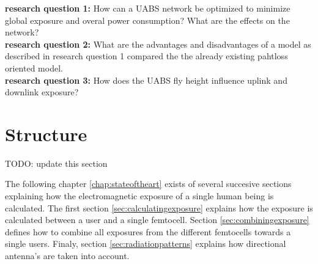 \textbf{research question 1:} How can a \gls{UABS} network be optimized to minimize global exposure and overal power consumption? What are the effects on the network?\\

\textbf{research question 2:} What are the advantages and disadvantages of a model as described in research question 1 compared the the already existing pahtloss oriented model.\\

\textbf{research question 3:} How does the \gls{UABS} fly height influence uplink and downlink exposure?



\section{Structure}
\label{sec:structure}

TODO: update this section

The following chapter \ref{chap:stateoftheart} exists of several succesive sections explaining how the electromagnetic exposure of a single human being is calculated. The first section \ref{sec:calculatingexposure}
explains how the exposure is calculated between a user and a single femtocell. Section \ref{sec:combiningexposure}  defines how to combine all exposures from the different femtocells towards a single users.
Finaly, section \ref{sec:radiationpatterns} explains how directional antenna's are taken into account.

